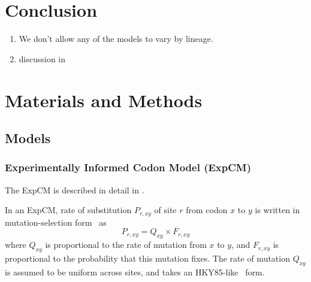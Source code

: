 \documentclass[11pt]{article}
\begin{document}
\section*{Conclusion}

\begin{enumerate}
  \item We don't allow any of the models to vary by lineage. 
  \item discussion in \citet{rodrigue2010mutation}
\end{enumerate}

\section*{Materials and Methods}

\subsection*{Models}

\subsubsection*{Experimentally Informed Codon Model (ExpCM)}

The ExpCM is described in detail in \citet{hilton2017phydms}. 

In an ExpCM, rate of substitution $P_{r,xy}$ of site $r$ from codon $x$ to $y$ is written in mutation-selection form~\citep{halpern1998evolutionary,mccandlish2014modeling,spielman2015relationship} as
\begin{equation}
P_{r,xy} = Q_{xy} \times F_{r,xy}
\end{equation}
where $Q_{xy}$ is proportional to the rate of mutation from $x$ to $y$, and $F_{r,xy}$ is proportional to the probability that this mutation fixes.
The rate of mutation $Q_{xy}$ is assumed to be uniform across sites, and takes an HKY85-like~\citep{hasegawa1985dating} form.
\end{document}
